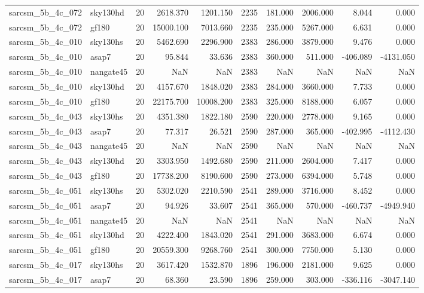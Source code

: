 \begin{longtable}{llrrrrrrrr}
sarcsm\_5b\_4c\_072 & sky130hd & 20 & 2618.370 & 1201.150 & 2235 & 181.000 & 2006.000 & 8.044 & 0.000 \\
sarcsm\_5b\_4c\_072 & gf180 & 20 & 15000.100 & 7013.660 & 2235 & 235.000 & 5267.000 & 6.631 & 0.000 \\
sarcsm\_5b\_4c\_010 & sky130hs & 20 & 5462.690 & 2296.900 & 2383 & 286.000 & 3879.000 & 9.476 & 0.000 \\
sarcsm\_5b\_4c\_010 & asap7 & 20 & 95.844 & 33.636 & 2383 & 360.000 & 511.000 & -406.089 & -4131.050 \\
sarcsm\_5b\_4c\_010 & nangate45 & 20 & NaN & NaN & 2383 & NaN & NaN & NaN & NaN \\
sarcsm\_5b\_4c\_010 & sky130hd & 20 & 4157.670 & 1848.020 & 2383 & 284.000 & 3660.000 & 7.733 & 0.000 \\
sarcsm\_5b\_4c\_010 & gf180 & 20 & 22175.700 & 10008.200 & 2383 & 325.000 & 8188.000 & 6.057 & 0.000 \\
sarcsm\_5b\_4c\_043 & sky130hs & 20 & 4351.380 & 1822.180 & 2590 & 220.000 & 2778.000 & 9.165 & 0.000 \\
sarcsm\_5b\_4c\_043 & asap7 & 20 & 77.317 & 26.521 & 2590 & 287.000 & 365.000 & -402.995 & -4112.430 \\
sarcsm\_5b\_4c\_043 & nangate45 & 20 & NaN & NaN & 2590 & NaN & NaN & NaN & NaN \\
sarcsm\_5b\_4c\_043 & sky130hd & 20 & 3303.950 & 1492.680 & 2590 & 211.000 & 2604.000 & 7.417 & 0.000 \\
sarcsm\_5b\_4c\_043 & gf180 & 20 & 17738.200 & 8190.600 & 2590 & 273.000 & 6394.000 & 5.748 & 0.000 \\
sarcsm\_5b\_4c\_051 & sky130hs & 20 & 5302.020 & 2210.590 & 2541 & 289.000 & 3716.000 & 8.452 & 0.000 \\
sarcsm\_5b\_4c\_051 & asap7 & 20 & 94.926 & 33.607 & 2541 & 365.000 & 570.000 & -460.737 & -4949.940 \\
sarcsm\_5b\_4c\_051 & nangate45 & 20 & NaN & NaN & 2541 & NaN & NaN & NaN & NaN \\
sarcsm\_5b\_4c\_051 & sky130hd & 20 & 4222.400 & 1843.020 & 2541 & 291.000 & 3683.000 & 6.674 & 0.000 \\
sarcsm\_5b\_4c\_051 & gf180 & 20 & 20559.300 & 9268.760 & 2541 & 300.000 & 7750.000 & 5.130 & 0.000 \\
sarcsm\_5b\_4c\_017 & sky130hs & 20 & 3617.420 & 1532.870 & 1896 & 196.000 & 2181.000 & 9.625 & 0.000 \\
sarcsm\_5b\_4c\_017 & asap7 & 20 & 68.360 & 23.590 & 1896 & 259.000 & 303.000 & -336.116 & -3047.140 \\

\end{longtable}
